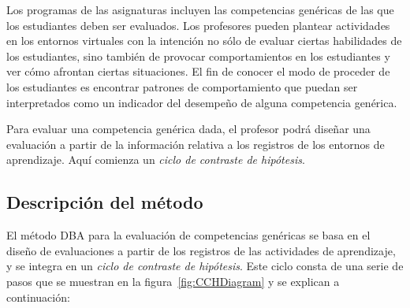 Los programas de las asignaturas incluyen las competencias genéricas de las que los estudiantes deben ser evaluados. Los profesores pueden plantear actividades en los entornos virtuales con la intención no sólo de evaluar ciertas habilidades de los estudiantes, sino también de provocar comportamientos en los estudiantes y ver cómo afrontan ciertas situaciones. El fin de conocer el modo de proceder de los estudiantes es encontrar patrones de comportamiento que puedan ser interpretados como un indicador del desempeño de alguna competencia genérica.

Para evaluar una competencia genérica dada, el profesor podrá diseñar una evaluación a partir de la información relativa a los registros de los entornos de aprendizaje. Aquí comienza un \emph{ciclo de contraste de hipótesis}. 





\subsection{Descripción del método}

El método DBA para la evaluación de competencias genéricas se basa en el diseño de evaluaciones a partir de los registros de las actividades de aprendizaje, y se integra en un \emph{ciclo de contraste de hipótesis}. Este ciclo consta de una serie de pasos que se muestran en la figura~\ref{fig:CCHDiagram} y se explican a continuación:

